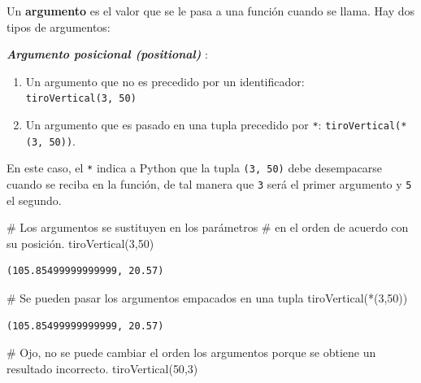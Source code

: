 \documentclass[
  spanish,
  letterpaper,
]{scrbook}
\newenvironment{Shaded}{\begin{snugshade}}{\end{snugshade}}
\newcommand{\CommentTok}[1]{\textcolor[rgb]{0.37,0.37,0.37}{#1}}
\newcommand{\DecValTok}[1]{\textcolor[rgb]{0.68,0.00,0.00}{#1}}
\newcommand{\NormalTok}[1]{\textcolor[rgb]{0.00,0.23,0.31}{#1}}
\newcommand{\OperatorTok}[1]{\textcolor[rgb]{0.37,0.37,0.37}{#1}}
\theoremstyle{definition}
\theoremstyle{remark}
\begin{document}
Un \textbf{argumento} es el valor que se le pasa a una función cuando se
llama. Hay dos tipos de argumentos:

\textbf{\emph{Argumento posicional (positional)}} :

\begin{enumerate}
\def\labelenumi{\arabic{enumi}.}
\item
  Un argumento que no es precedido por un identificador:
  \texttt{tiroVertical(3,\ 50)}
\item
  Un argumento que es pasado en una tupla precedido por \texttt{*}:
  \texttt{tiroVertical(*(3,\ 50))}.
\end{enumerate}

En este caso, el \texttt{*} indica a Python que la tupla
\texttt{(3,\ 50)} debe desempacarse cuando se reciba en la función, de
tal manera que \texttt{3} será el primer argumento y \texttt{5} el
segundo.

\begin{Shaded}
\begin{Highlighting}[]
\CommentTok{\# Los argumentos se sustituyen en los parámetros }
\CommentTok{\# en el orden de acuerdo con su posición.}
\NormalTok{tiroVertical(}\DecValTok{3}\NormalTok{,}\DecValTok{50}\NormalTok{)}
\end{Highlighting}
\end{Shaded}

\begin{verbatim}
(105.85499999999999, 20.57)
\end{verbatim}

\begin{Shaded}
\begin{Highlighting}[]
\CommentTok{\# Se pueden pasar los argumentos empacados en una tupla}
\NormalTok{tiroVertical(}\OperatorTok{*}\NormalTok{(}\DecValTok{3}\NormalTok{,}\DecValTok{50}\NormalTok{))}
\end{Highlighting}
\end{Shaded}

\begin{verbatim}
(105.85499999999999, 20.57)
\end{verbatim}

\begin{Shaded}
\begin{Highlighting}[]
\CommentTok{\# Ojo, no se puede cambiar el orden los argumentos porque se obtiene un resultado incorrecto.}
\NormalTok{tiroVertical(}\DecValTok{50}\NormalTok{,}\DecValTok{3}\NormalTok{)}
\end{Highlighting}
\end{Shaded}
\end{document}
